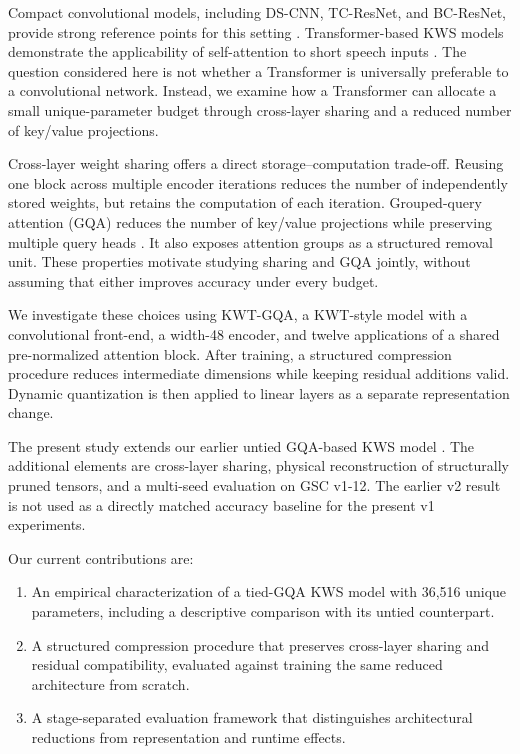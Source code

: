 \documentclass[journal]{IEEEtran}
\newcommand{\modelname}{KWT-GQA}
\begin{document}
Compact convolutional models, including DS-CNN, TC-ResNet,
and BC-ResNet, provide strong reference points for this setting
\cite{zhang2017hello,choi2019temporal,kim2021bcresnet}.
Transformer-based KWS models demonstrate the applicability of
self-attention to short speech inputs
\cite{berg2021kwt}.
The question considered here is not whether a Transformer is
universally preferable to a convolutional network.
Instead, we examine how a Transformer can allocate a small
unique-parameter budget through cross-layer sharing and a reduced
number of key/value projections.

Cross-layer weight sharing offers a direct storage--computation
trade-off.
Reusing one block across multiple encoder iterations reduces the
number of independently stored weights, but retains the computation
of each iteration.
Grouped-query attention (GQA) reduces the number of key/value
projections while preserving multiple query heads
\cite{ainslie2023gqa}.
It also exposes attention groups as a structured removal unit.
These properties motivate studying sharing and GQA jointly,
without assuming that either improves accuracy under every budget.

We investigate these choices using \modelname{}, a KWT-style model
with a convolutional front-end, a width-48 encoder, and twelve
applications of a shared pre-normalized attention block.
After training, a structured compression procedure reduces
intermediate dimensions while keeping residual additions valid.
Dynamic quantization is then applied to linear layers as a separate
representation change.

The present study extends our earlier untied GQA-based KWS model
\cite{zareprev}.
The additional elements are cross-layer sharing, physical
reconstruction of structurally pruned tensors, and a multi-seed
evaluation on GSC v1-12.
The earlier v2 result is not used as a directly matched accuracy
baseline for the present v1 experiments.

Our current contributions are:
\begin{enumerate}
  \item An empirical characterization of a tied-GQA KWS model
  with 36,516 unique parameters, including a descriptive comparison
  with its untied counterpart.
  \item A structured compression procedure that preserves
  cross-layer sharing and residual compatibility, evaluated against
  training the same reduced architecture from scratch.
  \item A stage-separated evaluation framework that distinguishes
  architectural reductions from representation and runtime effects.
\end{enumerate}
\end{document}
